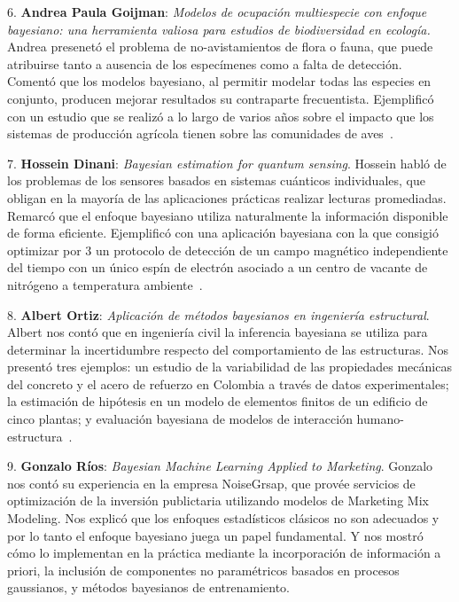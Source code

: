 \documentclass[a4paper,11pt]{book}
\theoremstyle{definition}
\begin{document}
\hspace{0.6cm} 6. \textbf{Andrea Paula Goijman}:  \emph{Modelos de ocupación multiespecie con enfoque bayesiano: una herramienta valiosa para estudios de biodiversidad en ecología.}
%
Andrea presenetó el problema de no-avistamientos de flora o fauna, que puede atribuirse tanto a ausencia de los especímenes como a falta de detección.
%
Comentó que los modelos bayesiano, al permitir modelar todas las especies en conjunto, producen mejorar resultados su contraparte frecuentista.
%
Ejemplificó con un estudio que se realizó a lo largo de varios años sobre el impacto que los sistemas de producción agrícola tienen sobre las comunidades de aves~\cite{Goijman2020, Contreras2022}.

\hspace{0.6cm} 7. \textbf{Hossein Dinani}: \emph{Bayesian estimation for quantum sensing}.
%
Hossein habló de los problemas de los sensores basados en sistemas cuánticos individuales, que obligan en la mayoría de las aplicaciones prácticas realizar lecturas promediadas.
%
Remarcó que el enfoque bayesiano utiliza naturalmente la información disponible de forma eficiente.
%
Ejemplificó con una aplicación bayesiana con la que consigió optimizar por 3 un protocolo de detección de un campo magnético independiente del tiempo con un único espín de electrón asociado a un centro de vacante de nitrógeno a temperatura ambiente~\cite{Dinani2019}.

\hspace{0.6cm} 8. \textbf{Albert Ortiz}: \emph{Aplicación de métodos bayesianos en ingeniería estructural}.
%
Albert nos contó que en ingeniería civil la inferencia bayesiana se utiliza para determinar la incertidumbre respecto del comportamiento de las estructuras.
%
Nos presentó tres ejemplos: un estudio de la variabilidad de las propiedades mecánicas del concreto y el acero de refuerzo en Colombia a través de datos experimentales; la estimación de hipótesis en un modelo de elementos finitos de un edificio de cinco plantas; y evaluación bayesiana de modelos de interacción humano-estructura~\cite{Hurtado2023, Guerrero2022, Calonge2023}.

\hspace{0.6cm} 9. \textbf{Gonzalo Ríos}: \emph{Bayesian Machine Learning Applied to Marketing}.
%
Gonzalo nos contó su experiencia en la empresa NoiseGrsap, que provée servicios de optimización de la inversión publictaria utilizando modelos de Marketing Mix Modeling.
%
Nos explicó que los enfoques estadísticos clásicos no son adecuados y por lo tanto el enfoque bayesiano juega un papel fundamental.
%
Y nos mostró cómo lo implementan en la práctica mediante la incorporación de información a priori, la inclusión de componentes no paramétricos basados en procesos gaussianos, y métodos bayesianos de entrenamiento.
\end{document}

